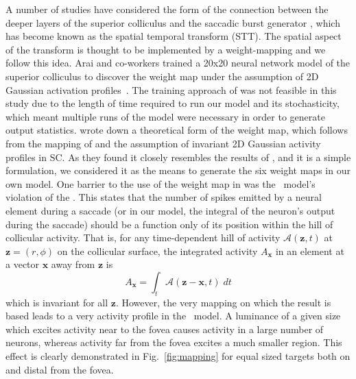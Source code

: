\documentclass{frontiersSCNS}
\begin{document}
A number of studies have considered the form of the connection between
the deeper layers of the superior colliculus and the saccadic burst
generator \citep{van_gisbergen_experimental_1985,ottes_visuomotor_1986,waitzman_superior_1991,groh_converting_2001,arai_two-dimensional_1994,goossens_dynamic_2006,tabareau_geometry_2007,van_opstal_linear_2008,goossens_optimal_2012},
which has become known as the spatial temporal transform (STT).  The
spatial aspect of the transform is thought to be implemented by a
weight-mapping \citep{tabareau_geometry_2007,arai_two-dimensional_1994}
and we follow this idea.
%
Arai and co-workers trained a 20x20 neural network model of the
superior colliculus to discover the weight map under the assumption of
2D Gaussian activation profiles~\citep{arai_two-dimensional_1994}.
%
The training approach of \cite{arai_two-dimensional_1994} was not
feasible in this study due to the length of time required to run our
model and its stochasticity, which meant multiple runs of the model
were necessary in order to generate output statistics.
%
\cite{tabareau_geometry_2007} wrote down a theoretical form of the weight
map, which follows from the mapping of \cite{ottes_visuomotor_1986}
and the assumption of invariant 2D Gaussian activity profiles in
SC. As they found it closely resembles the results
of \cite{arai_two-dimensional_1994}, and it is a simple formulation,
we considered it as the means to generate the six weight maps in our
own model.
%
One barrier to the use of the weight map
in \cite{tabareau_geometry_2007} was the \ccg~model's violation of the
. This states that the number of spikes
emitted by a neural element during a saccade (or in our model, the
integral of the neuron's output during the saccade) should be a
function only of its position within the hill of collicular
activity. That is, for any time-dependent hill of activity
$\mathcal{A}(\mathbf{z},t)$ at $\mathbf{z} = (r,\phi)$ on the collicular
surface, the integrated activity  $A_{\mathbf{x}}$ in an element at a
vector $\mathbf{x}$ away from $\mathbf{z}$ is
\begin{equation}
A_{\mathbf{x}} = \int_t \mathcal{A}(\mathbf{z}-\mathbf{x}, t)\;dt
\end{equation}
which is invariant for all $\mathbf{z}$. However, the very mapping on
which the \cite{tabareau_geometry_2007} result is based leads to a
very  activity profile in the \ccg~model. A luminance of a
given size which excites activity near to the fovea causes activity in
a large number of neurons, whereas activity far from the fovea excites
a much smaller region. This effect is clearly demonstrated in
Fig.~\ref{fig:mapping} for equal sized targets both on and distal from
the fovea.
\end{document}
